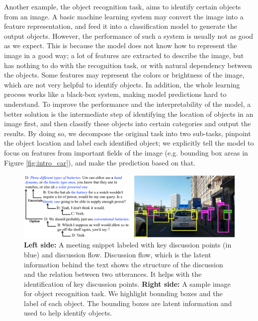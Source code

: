 Another example, the object recognition task, aims to identify certain objects from an image. A basic machine learning system may convert the image into a feature representation, and feed it into a classification model to generate the output objects. However, the performance of such a system is usually not as good as we expect. This is because the model does not know how to represent the image in a good way; a lot of features are extracted to describe the image, but has nothing to do with the recognition task, or with natural dependency between the objects. Some features may represent the colors or brightness of the image, which are not very helpful to identify objects. In addition, the whole learning process works like a black-box system, making model predictions hard to understand. To improve the performance and the interpretability of the model, a better solution is the intermediate step of identifying the location of objects in an image first, and then classify these objects into certain categories and output the results. By doing so, we decompose the original task into two sub-tasks, pinpoint the object location and label each identified object; we explicitly tell the model to focus on features from important fields of the image (e.g. bounding box areas in Figure \ref{fig:intro_car}), and make the prediction based on that. 

\begin{figure}[t] 
\centering
\includegraphics[width=1.0\columnwidth]{Images/intro_txt_car2.png} 
  \caption{\textbf{Left side:} A meeting snippet labeled with key discussion points (in blue) and discussion flow. Discussion flow, which is the latent information behind the text shows the structure of the discussion and the relation between two utterances. It helps with the identification of key discussion points. \textbf{Right side:} A sample image for object recognition task. We highlight bounding boxes and the label of each object. The bounding boxes are latent information and used to help identify objects.}
\end{figure}\label{fig:intro_car} 



